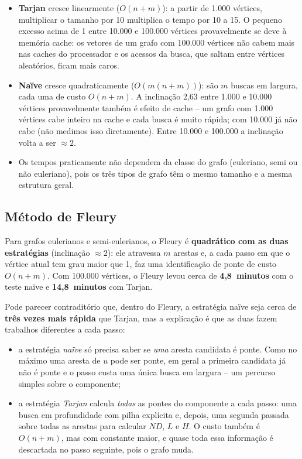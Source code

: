 \begin{itemize}
  \item \textbf{Tarjan} cresce linearmente ($O(n+m)$): a partir de 1.000 vértices, multiplicar o tamanho
        por 10 multiplica o tempo por 10 a 15. O pequeno excesso acima de 1 entre 10.000 e 100.000 vértices provavelmente se deve
        à memória cache: os vetores de um grafo com 100.000 vértices não cabem mais nas caches do
        processador e os acessos da busca, que saltam entre vértices aleatórios, ficam mais caros.
  \item \textbf{Naïve} cresce quadraticamente ($O(m(n+m))$): são $m$ buscas em largura, cada uma de
        custo $O(n+m)$. A inclinação 2,63 entre 1.000 e 10.000 vértices provavelmente também é
        efeito de cache -- um grafo com 1.000 vértices cabe inteiro na cache e cada busca é muito rápida;
        com 10.000 já não cabe (não medimos isso diretamente). Entre 10.000 e 100.000 a inclinação volta a ser $\approx 2$.
  \item Os tempos praticamente não dependem da classe do grafo (euleriano, semi ou não euleriano),
        pois os três tipos de grafo têm o mesmo tamanho e a mesma estrutura geral.
\end{itemize}

\subsection{Método de Fleury}

Para grafos eulerianos e semi-eulerianos, o Fleury é \textbf{quadrático com as duas estratégias}
(inclinação $\approx 2$): ele atravessa $m$ arestas e, a cada passo em que o vértice atual tem grau
maior que 1, faz uma identificação de ponte de custo $O(n+m)$. Com 100.000 vértices, o Fleury levou
cerca de \textbf{4,8~minutos} com o teste naïve e \textbf{14,8~minutos} com Tarjan.

Pode parecer contraditório que, dentro do Fleury, a estratégia naïve seja cerca de \textbf{três vezes
mais rápida} que Tarjan, mas a explicação é que as duas fazem trabalhos diferentes a cada passo:

\begin{itemize}
  \item a estratégia \emph{naïve} só precisa saber se \emph{uma} aresta candidata é ponte. Como no
        máximo uma aresta de $u$ pode ser ponte, em geral a primeira candidata já não é ponte e o passo
        custa uma única busca em largura -- um percurso simples sobre o componente;
  \item a estratégia \emph{Tarjan} calcula \emph{todas} as pontes do componente a cada passo: uma busca em
        profundidade com pilha explícita e, depois, uma segunda passada sobre todas as arestas para
        calcular $ND$, $L$ e $H$. O custo também é $O(n+m)$, mas com constante maior, e quase toda essa
        informação é descartada no passo seguinte, pois o grafo muda.
\end{itemize}

